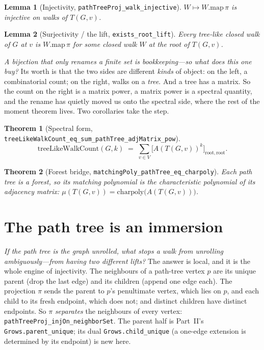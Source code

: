 \documentclass[11pt]{article}
\newtheorem{theorem}{Theorem}
\newtheorem{lemma}{Lemma}
\newcommand{\lean}[1]{\texttt{#1}}
\begin{document}
\begin{lemma}[Injectivity, \lean{pathTreeProj\_walk\_injective}]\label{lem:inj}
$W\mapsto W.\mathrm{map}\,\pi$ is injective on walks of $T(G,v)$.
\end{lemma}

\begin{lemma}[Surjectivity / the lift, \lean{exists\_root\_lift}]\label{lem:surj}
Every tree-like closed walk of $G$ at $v$ is $W.\mathrm{map}\,\pi$ for some closed walk $W$ at the
root of $T(G,v)$.
\end{lemma}

\emph{A bijection that only renames a finite set is bookkeeping---so what does this one buy?} Its
worth is that the two sides are different \emph{kinds} of object: on the left, a combinatorial count;
on the right, walks on a \emph{tree}. And a tree has a matrix. So the count on the right is a matrix
power, a matrix power is a spectral quantity, and the rename has quietly moved us onto the spectral
side, where the rest of the moment theorem lives. Two corollaries take the step.

\begin{theorem}[Spectral form, \lean{treeLikeWalkCount\_eq\_sum\_pathTree\_adjMatrix\_pow}]
\label{thm:spectral}
\[
  \mathrm{treeLikeWalkCount}(G,k)\;=\;\sum_{v\in V}\bigl[A(T(G,v))^{k}\bigr]_{\mathrm{root},\mathrm{root}}.
\]
\end{theorem}

\begin{theorem}[Forest bridge, \lean{matchingPoly\_pathTree\_eq\_charpoly}]\label{thm:forest}
Each path tree is a forest, so its matching polynomial is the characteristic polynomial of its
adjacency matrix: $\mu(T(G,v))=\mathrm{charpoly}\bigl(A(T(G,v))\bigr)$.
\end{theorem}

\section{The path tree is an immersion}
\label{sec:inj}

\emph{If the path tree is the graph unrolled, what stops a walk from unrolling ambiguously---from
having two different lifts?} The answer is local, and it is the whole engine of injectivity. The
neighbours of a
path-tree vertex $p$ are its unique parent (drop the last edge) and its
children (append one edge each). The projection $\pi$ sends the parent to $p$'s penultimate vertex,
which lies on $p$, and each child to its fresh endpoint, which does not; and distinct children have
distinct endpoints. So $\pi$ \emph{separates} the neighbours of every vertex:
\lean{pathTreeProj\_injOn\_neighborSet}. The parent half is Part~II's \lean{Grows.parent\_unique};
its dual \lean{Grows.child\_unique} (a one-edge extension is determined by its endpoint) is new here.
\end{document}
